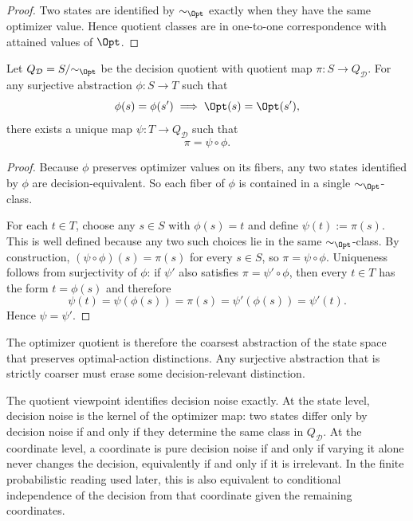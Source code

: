 \begin{proof}
Two states are identified by $\sim_{\Opt}$ exactly when they have the same optimizer value. Hence quotient classes are in one-to-one correspondence with attained values of $\Opt$.
\end{proof}

\begin{theorem}\label{thm:quotient-universal}
Let $Q_{\mathcal{D}}=S/{\sim_{\Opt}}$ be the decision quotient with quotient map $\pi:S\to Q_{\mathcal{D}}$. For any surjective abstraction $\phi:S\to T$ such that
\[
\phi(s)=\phi(s') \implies \Opt(s)=\Opt(s'),
\]
there exists a unique map $\psi:T\to Q_{\mathcal{D}}$ such that
\[
\pi = \psi \circ \phi.
\]
\end{theorem}


\begin{proof}
Because $\phi$ preserves optimizer values on its fibers, any two states identified by $\phi$ are decision-equivalent. So each fiber of $\phi$ is contained in a single $\sim_{\Opt}$-class.

For each $t \in T$, choose any $s \in S$ with $\phi(s)=t$ and define $\psi(t):=\pi(s)$. This is well defined because any two such choices lie in the same $\sim_{\Opt}$-class. By construction, $(\psi\circ\phi)(s)=\pi(s)$ for every $s\in S$, so $\pi=\psi\circ\phi$. Uniqueness follows from surjectivity of $\phi$: if $\psi'$ also satisfies $\pi=\psi'\circ\phi$, then every $t\in T$ has the form $t=\phi(s)$ and therefore
\[
\psi(t)=\psi(\phi(s))=\pi(s)=\psi'(\phi(s))=\psi'(t).
\]
Hence $\psi=\psi'$.
\end{proof}

\begin{remark}\label{rem:quotient-canonical}
The optimizer quotient is therefore the coarsest abstraction of the state space that preserves optimal-action distinctions. Any surjective abstraction that is strictly coarser must erase some decision-relevant distinction.
\end{remark}


\begin{remark}\label{rem:decision-noise}
The quotient viewpoint identifies decision noise exactly. At the state level, decision noise is the kernel of the optimizer map: two states differ only by decision noise if and only if they determine the same class in $Q_{\mathcal{D}}$. At the coordinate level, a coordinate is pure decision noise if and only if varying it alone never changes the decision, equivalently if and only if it is irrelevant. In the finite probabilistic reading used later, this is also equivalent to conditional independence of the decision from that coordinate given the remaining coordinates.
\end{remark}

